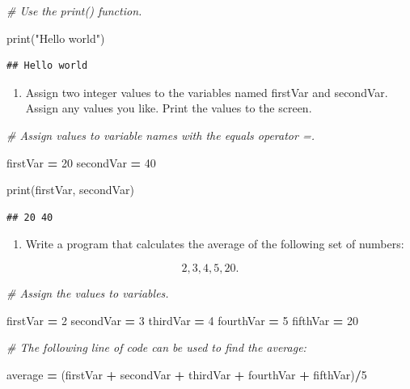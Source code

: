 \documentclass[
]{book}
\newenvironment{Shaded}{\begin{snugshade}}{\end{snugshade}}
\newcommand{\BuiltInTok}[1]{#1}
\newcommand{\CommentTok}[1]{\textcolor[rgb]{0.56,0.35,0.01}{\textit{#1}}}
\newcommand{\DecValTok}[1]{\textcolor[rgb]{0.00,0.00,0.81}{#1}}
\newcommand{\NormalTok}[1]{#1}
\newcommand{\OperatorTok}[1]{\textcolor[rgb]{0.81,0.36,0.00}{\textbf{#1}}}
\newcommand{\StringTok}[1]{\textcolor[rgb]{0.31,0.60,0.02}{#1}}
\providecommand{\tightlist}{%
  \setlength{\itemsep}{0pt}\setlength{\parskip}{0pt}}
\begin{document}
\begin{Shaded}
\begin{Highlighting}[]
\CommentTok{\# Use the print() function.}

\BuiltInTok{print}\NormalTok{(}\StringTok{"Hello world"}\NormalTok{)}
\end{Highlighting}
\end{Shaded}

\begin{verbatim}
## Hello world
\end{verbatim}

\begin{enumerate}
\def\labelenumi{\arabic{enumi}.}
\setcounter{enumi}{1}
\tightlist
\item
  Assign two integer values to the variables named firstVar and secondVar. Assign any values you like. Print the values to the screen.
\end{enumerate}

\begin{Shaded}
\begin{Highlighting}[]
\CommentTok{\# Assign values to variable names with the \textquotesingle{}equals\textquotesingle{} operator \textquotesingle{}=\textquotesingle{}.}

\NormalTok{firstVar }\OperatorTok{=} \DecValTok{20}
\NormalTok{secondVar }\OperatorTok{=} \DecValTok{40}

\BuiltInTok{print}\NormalTok{(firstVar, secondVar)}
\end{Highlighting}
\end{Shaded}

\begin{verbatim}
## 20 40
\end{verbatim}

\begin{enumerate}
\def\labelenumi{\arabic{enumi}.}
\setcounter{enumi}{2}
\tightlist
\item
  Write a program that calculates the average of the following set of numbers:
\end{enumerate}

\[2,3,4,5,20.\]

\begin{Shaded}
\begin{Highlighting}[]
\CommentTok{\# Assign the values to variables.}

\NormalTok{firstVar }\OperatorTok{=} \DecValTok{2}
\NormalTok{secondVar }\OperatorTok{=} \DecValTok{3}
\NormalTok{thirdVar }\OperatorTok{=} \DecValTok{4}
\NormalTok{fourthVar }\OperatorTok{=} \DecValTok{5}
\NormalTok{fifthVar }\OperatorTok{=} \DecValTok{20}

\CommentTok{\# The following line of code can be used to find the average:}

\NormalTok{average }\OperatorTok{=}\NormalTok{ (firstVar }\OperatorTok{+}\NormalTok{ secondVar }\OperatorTok{+}\NormalTok{ thirdVar }\OperatorTok{+}\NormalTok{ fourthVar }\OperatorTok{+}\NormalTok{ fifthVar)}\OperatorTok{/}\DecValTok{5}
\end{Highlighting}
\end{Shaded}
\end{document}
